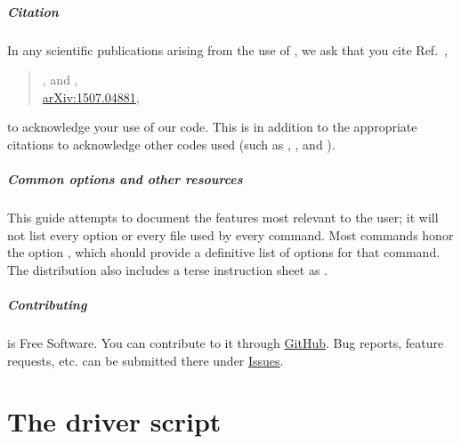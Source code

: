 \paragraph{Citation} In any scientific publications arising from the
use of \woptic, we ask that you cite Ref.~\cite{woptic},
%
\begin{quote}
  , and
  ,\\
  \href{http://arxiv.org/abs/1507.04881}{arXiv:1507.04881},
\end{quote}
%
to acknowledge your use of our code.  This is in addition to the
appropriate citations to acknowledge other codes used (such as \wien
\cite{wien2k}, \wannier \cite{wien2wannier}, and \wtow
\cite{wannier90}).

\paragraph{Common options and other resources} This guide attempts to
document the features most relevant to the \woptic user; it will not
list every option or every file used by every command.  Most commands
honor the option , which should provide a definitive
list of options for that command.  The \woptic distribution also
includes a terse instruction sheet as .

\paragraph{Contributing} \Woptic is Free Software.  You can contribute
to it through \href{https://github.com/woptic/woptic}{GitHub}.  Bug
reports, feature requests, etc. can be submitted there under
\href{https://github.com/woptic/woptic/issues}{Issues}.

\MyTOC

\mainmatter


\chapter{The driver script \woprogHd}
\label{sec:woprog}


